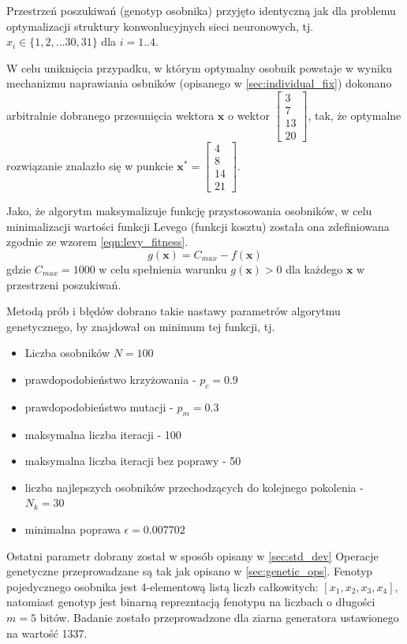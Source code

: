 Przestrzeń poszukiwań (genotyp osobnika) przyjęto identyczną jak dla problemu optymalizacji struktury konwonlucyjnych sieci neuronowych, tj. $x_i \in \lbrace 1, 2, ... 30, 31 \rbrace$ dla $i = 1..4$.

W celu uniknięcia przypadku, w którym optymalny osobnik powstaje w wyniku mechanizmu naprawiania osbników (opisanego w \ref{sec:individual_fix}) dokonano arbitralnie dobranego przesunięcia wektora $\mathbf{x}$ o wektor $\begin{bmatrix}3 \\ 7 \\ 13 \\ 20\end{bmatrix}$, tak, że optymalne rozwiązanie znalazło się w punkcie $\mathbf{x^*} = \begin{bmatrix}4 \\ 8 \\ 14 \\ 21\end{bmatrix}$.

Jako, że algorytm maksymalizuje funkcję przystosowania osobników, w celu minimalizacji wartości funkcji Levego (funkcji kosztu) została ona zdefiniowana zgodnie ze wzorem \ref{eqn:levy_fitness}. \cite{bialaszewski2012}
\begin{equation}\label{eqn:levy_fitness}
  g(\mathbf{x}) = C_{max} - f(\mathbf{x})
\end{equation}
gdzie $C_{max} = 1000$ w celu spełnienia warunku $g(\textbf{x}) > 0$ dla każdego $\textbf{x}$ w przestrzeni poszukiwań.

Metodą prób i błędów dobrano takie nastawy parametrów algorytmu genetycznego, by znajdował on minimum tej funkcji, tj.
\begin{itemize}
  \item Liczba osobników $N = 100$
  \item prawdopodobieństwo krzyżowania - $p_{c} = 0.9$
  \item prawdopodobieństwo mutacji - $p_{m} = 0.3$
  \item maksymalna liczba iteracji - 100
  \item maksymalna liczba iteracji bez poprawy - 50
  \item liczba najlepszych osobników przechodzących do kolejnego pokolenia - $ N_{k} = 30$
  \item minimalna poprawa $\epsilon = 0.007702$
\end{itemize}

Ostatni parametr dobrany został w sposób opisany w \ref{sec:std_dev}
Operacje genetyczne przeprowadzane są tak jak opisano w \ref{sec:genetic_ops}.
Fenotyp pojedycznego osobnika jest 4-elementową listą liczb całkowitych: $[ x_1, x_2, x_3, x_4]$, natomiast genotyp jest binarną reprezntacją fenotypu na liczbach o długości $m=5$ bitów.
Badanie zostało przeprowadzone dla ziarna generatora ustawionego na wartość 1337.

